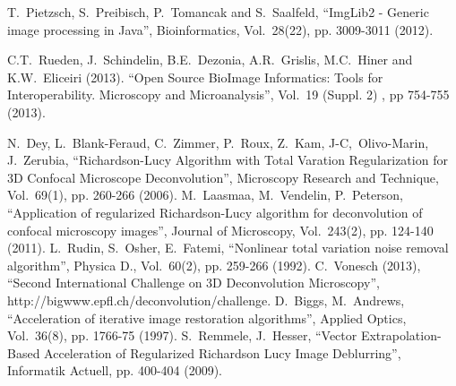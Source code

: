 \documentclass[conference,a4paper]{IEEEtran}
\begin{document}
\begin{thebibliography}{}

 T.\ Pietzsch, S.\ Preibisch, P.\ Tomancak and S.\ Saalfeld, ``ImgLib2 - Generic image processing in Java'', Bioinformatics, Vol.\  28(22), pp. 3009-3011 (2012).

 C.T.\ Rueden, J.\ Schindelin, B.E.\ Dezonia, A.R.\ Grislis, M.C.\ Hiner and K.W.\ Eliceiri (2013). ``Open Source BioImage Informatics: Tools for Interoperability. Microscopy and Microanalysis'', Vol.\ 19 (Suppl. 2) , pp 754-755 (2013). 

 N.\ Dey, L.\ Blank-Feraud, C.\ Zimmer, P.\ Roux, Z.\ Kam, J-C,\ Olivo-Marin, J.\ Zerubia, ``Richardson-Lucy Algorithm with Total Varation Regularization for 3D Confocal Microscope Deconvolution'', Microscopy Research and Technique, Vol.\ 69(1), pp. 260-266 (2006).
 M.\ Laasmaa, M.\ Vendelin, P.\ Peterson, ``Application of regularized Richardson-Lucy algorithm for deconvolution of confocal microscopy images'',  Journal of Microscopy, Vol.\ 243(2), pp. 124-140 (2011).
 L.\ Rudin, S.\ Osher, E.\ Fatemi, ``Nonlinear total variation noise removal algorithm'',  Physica D., Vol.\ 60(2), pp. 259-266 (1992).
 C.\ Vonesch (2013), ``Second International Challenge on 3D Deconvolution Microscopy'', http://bigwww.epfl.ch/deconvolution/challenge.
 D.\ Biggs, M.\ Andrews, ``Acceleration of iterative
image restoration algorithms'',  Applied Optics, Vol.\ 36(8), pp.
1766-75 (1997).
 S.\ Remmele, J.\ Hesser, ``Vector
Extrapolation-Based Acceleration of Regularized Richardson Lucy Image
Deblurring'',  Informatik Actuell, pp. 400-404 (2009).

\end{thebibliography}
\end{document}
